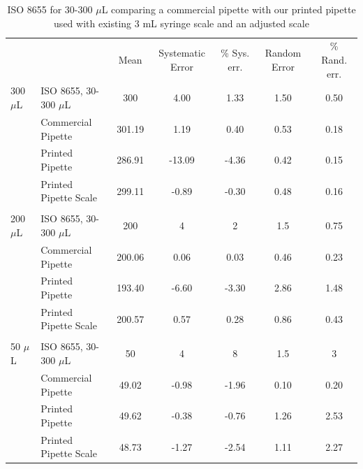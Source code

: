 \documentclass[10pt,letterpaper]{article}
\begin{document}
\begin{table}[!ht]
	\begin{adjustwidth}{-2.25in}{0in} %
		\centering
		\caption{ISO 8655 for 30-300 $\mu$L comparing a commercial pipette with our printed pipette used with existing 3 mL syringe scale and an adjusted scale}
		\label{table4}
		\begin{tabular}{llccccc}
			&                       & Mean   & Systematic Error & \% Sys. err. & Random Error & \% Rand. err. \\
			300 $\mu$L & ISO 8655, 30-300 $\mu$L   & 300    & 4.00             & 1.33         & 1.50         & 0.50          \\
			& Commercial Pipette    & 301.19 & 1.19             & 0.40         & 0.53         & 0.18          \\
			& Printed Pipette       & 286.91 & -13.09           & -4.36        & 0.42         & 0.15          \\
			& Printed Pipette Scale & 299.11 & -0.89            & -0.30        & 0.48         & 0.16          \\
			&                       &        &                  &              &              &               \\
			200 $\mu$L & ISO 8655, 30-300 $\mu$L   & 200    & 4                & 2            & 1.5          & 0.75          \\
			& Commercial Pipette    & 200.06 & 0.06             & 0.03         & 0.46         & 0.23          \\
			& Printed Pipette       & 193.40 & -6.60            & -3.30        & 2.86         & 1.48          \\
			& Printed Pipette Scale & 200.57 & 0.57             & 0.28         & 0.86         & 0.43          \\
			&                       &        &                  &              &              &               \\
			50 $\mu$L  & ISO 8655, 30-300 $\mu$L   & 50     & 4                & 8            & 1.5          & 3             \\
			& Commercial Pipette    & 49.02  & -0.98            & -1.96        & 0.10         & 0.20          \\
			& Printed Pipette       & 49.62  & -0.38            & -0.76        & 1.26         & 2.53          \\
			& Printed Pipette Scale & 48.73  & -1.27            & -2.54        & 1.11         & 2.27          \\

\end{tabular}
\end{adjustwidth}
\end{table}
\end{document}
